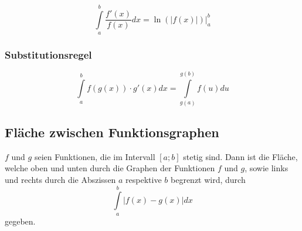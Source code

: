 $$\int\limits_a^b \frac{f'(x)}{f(x)} dx = \ln(|f(x)|)\Big |_a^b$$


\subsubsection{Substitutionsregel}

$$\int\limits_a^b f(g(x)) \cdot g'(x) dx = \int\limits_{g(a)}^{g(b)} f(u) du$$


\subsection{Fläche zwischen Funktionsgraphen} 

$f$ und $g$ seien Funktionen, die im Intervall $[a;b]$ stetig sind. Dann ist
die Fläche, welche oben und unten durch die Graphen der Funktionen $f$ und $g$,
sowie links und rechts durch die Abszissen $a$ respektive $b$ begrenzt wird,
durch
$$\int\limits_a^b |f(x) - g(x)| dx$$
gegeben.
